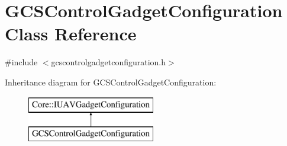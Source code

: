 \hypertarget{class_g_c_s_control_gadget_configuration}{\section{\-G\-C\-S\-Control\-Gadget\-Configuration \-Class \-Reference}
\label{class_g_c_s_control_gadget_configuration}
}


{\ttfamily \#include $<$gcscontrolgadgetconfiguration.\-h$>$}

\-Inheritance diagram for \-G\-C\-S\-Control\-Gadget\-Configuration\-:\begin{figure}[H]
\begin{center}
\leavevmode
\includegraphics[height=2.000000cm]{class_g_c_s_control_gadget_configuration}
\end{center}
\end{figure}
